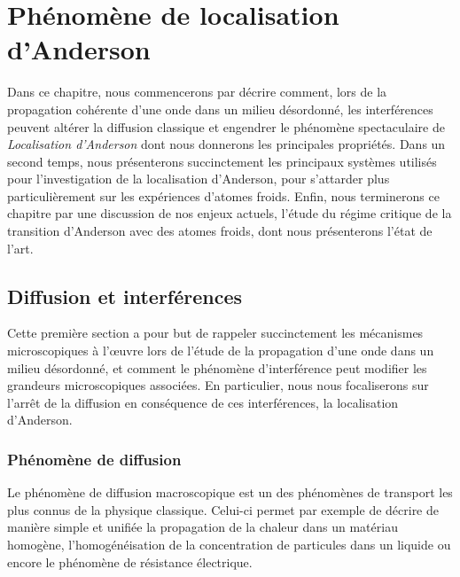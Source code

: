 
\chapter{Phénomène de localisation d'Anderson} 
\label{ch:Localisation}

Dans ce chapitre, nous commencerons par décrire comment, lors de la propagation cohérente d'une onde dans un milieu désordonné, les interférences peuvent altérer la diffusion classique et engendrer le phénomène spectaculaire de \emph{Localisation d'Anderson} dont nous donnerons les principales propriétés. Dans un second temps, nous présenterons succinctement les principaux systèmes utilisés pour l'investigation de la localisation d'Anderson, pour s'attarder plus particulièrement sur les expériences d'atomes froids. Enfin, nous terminerons ce chapitre par une discussion de nos enjeux actuels, l'étude du régime critique de la transition d'Anderson avec des atomes froids, dont nous présenterons l'état de l'art.

\section{Diffusion et interférences}
Cette première section a pour but de rappeler succinctement les mécanismes microscopiques à l'œuvre lors de l'étude de la propagation d'une onde dans un milieu désordonné, et comment le phénomène d'interférence peut modifier les grandeurs microscopiques associées. En particulier, nous nous focaliserons sur l'arrêt de la diffusion en conséquence de ces interférences, la localisation d'Anderson.

\subsection{Phénomène de diffusion}
\label{sc:diffusion_classique}
Le phénomène de diffusion macroscopique est un des phénomènes de transport les plus connus de la physique classique. Celui-ci permet par exemple de décrire de manière simple et unifiée la propagation de la chaleur dans un matériau homogène, l'homogénéisation de la concentration de particules dans un liquide ou encore le phénomène de résistance électrique. 

